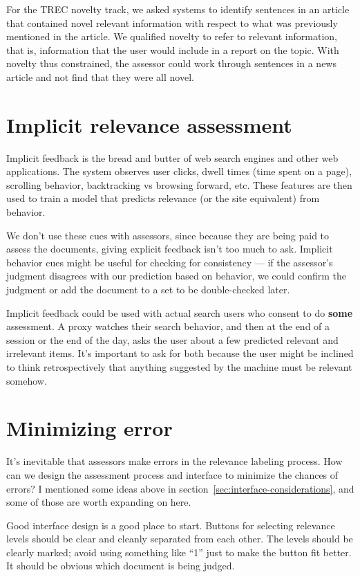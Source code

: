 \documentclass[nobib]{tufte-book}
\begin{document}
For the TREC novelty track, we asked systems to identify sentences in an article that contained novel relevant information with respect to what was previously mentioned in the article.\autocite{soboroff_novelty_2005}  We qualified novelty to refer to relevant information, that is, information that the user would include in a report on the topic.  With novelty thus constrained, the assessor could work through sentences in a news article and not find that they were all novel.

\section{Implicit relevance assessment}

Implicit feedback is the bread and butter of web search engines and other web applications.  The system observes user clicks, dwell times (time spent on a page), scrolling behavior, backtracking vs browsing forward, etc.  These features are then used to train a model that predicts relevance (or the site equivalent) from behavior.

We don't use these cues with assessors, since because they are being paid to assess the documents, giving explicit feedback isn't too much to ask.  Implicit behavior cues might be useful for checking for consistency --- if the assessor's judgment disagrees with our prediction based on behavior, we could confirm the judgment or add the document to a set to be double-checked later.

Implicit feedback could be used with actual search users who consent to do {\bf some} assessment.  A proxy watches their search behavior, and then at the end of a session or the end of the day, asks the user about a few predicted relevant and irrelevant items.  It's important to ask for both because the user might be inclined to think retrospectively that anything suggested by the machine must be relevant somehow.

\section{Minimizing error}

It's inevitable that assessors make errors in the relevance labeling process.  How can we design the assessment process and interface to minimize the chances of errors?  I mentioned some ideas above in section~\ref{sec:interface-considerations}, and some of those are worth expanding on here.

Good interface design is a good place to start.  Buttons for selecting relevance levels should be clear and cleanly separated from each other.  The levels should be clearly marked; avoid using something like ``1'' just to make the button fit better.  It should be obvious which document is being judged.
\end{document}
